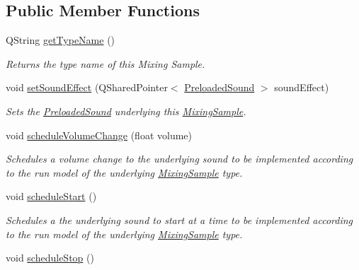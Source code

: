 \subsection*{Public Member Functions}
\begin{DoxyCompactItemize}
\item 
\hypertarget{class_picto_1_1_p_c_m_mixing_sample_adf5abf5deee65514a8b7345e10033fc2}{Q\-String \hyperlink{class_picto_1_1_p_c_m_mixing_sample_adf5abf5deee65514a8b7345e10033fc2}{get\-Type\-Name} ()}\label{class_picto_1_1_p_c_m_mixing_sample_adf5abf5deee65514a8b7345e10033fc2}

\begin{DoxyCompactList}\small\item\em Returns the type name of this Mixing Sample. \end{DoxyCompactList}\item 
void \hyperlink{class_picto_1_1_p_c_m_mixing_sample_ad0b5c52599275d4455c7a876f340a51f}{set\-Sound\-Effect} (Q\-Shared\-Pointer$<$ \hyperlink{class_picto_1_1_preloaded_sound}{Preloaded\-Sound} $>$ sound\-Effect)
\begin{DoxyCompactList}\small\item\em Sets the \hyperlink{class_picto_1_1_preloaded_sound}{Preloaded\-Sound} underlying this \hyperlink{class_picto_1_1_mixing_sample}{Mixing\-Sample}. \end{DoxyCompactList}\item 
void \hyperlink{class_picto_1_1_p_c_m_mixing_sample_a1876bd598742dbe7c47b5cb56758333d}{schedule\-Volume\-Change} (float volume)
\begin{DoxyCompactList}\small\item\em Schedules a volume change to the underlying sound to be implemented according to the run model of the underlying \hyperlink{class_picto_1_1_mixing_sample}{Mixing\-Sample} type. \end{DoxyCompactList}\item 
void \hyperlink{class_picto_1_1_p_c_m_mixing_sample_a01bdf31cdb69f75d073ec7f74116d978}{schedule\-Start} ()
\begin{DoxyCompactList}\small\item\em Schedules a the underlying sound to start at a time to be implemented according to the run model of the underlying \hyperlink{class_picto_1_1_mixing_sample}{Mixing\-Sample} type. \end{DoxyCompactList}\item 
void \hyperlink{class_picto_1_1_p_c_m_mixing_sample_a5bbf61241bcd000a280bac4fb0970a5e}{schedule\-Stop} ()

\end{DoxyCompactItemize}
